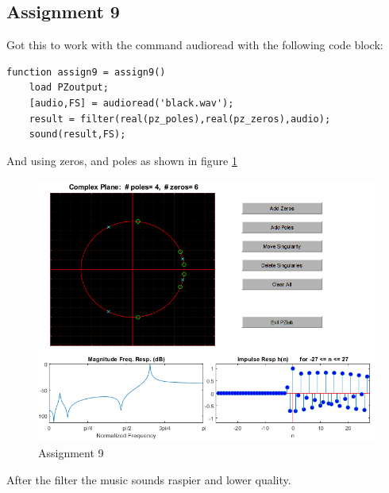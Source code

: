 \documentclass[a4paper]{article}
\begin{document}
\subsection{Assignment 9}
Got this to work with the command audioread with the following code block:
\begin{lstlisting}
function assign9 = assign9()
    load PZoutput;
    [audio,FS] = audioread('black.wav');
    result = filter(real(pz_poles),real(pz_zeros),audio);
    sound(result,FS);
\end{lstlisting}
And using zeros, and poles as shown in figure \ref{fig:9} \\
\begin{figure}
	\includegraphics{9.png}
	\caption{Assignment 9}
	\label{fig:9}
\end{figure}
After the filter the music sounds raspier and lower quality. 
\end{document}

